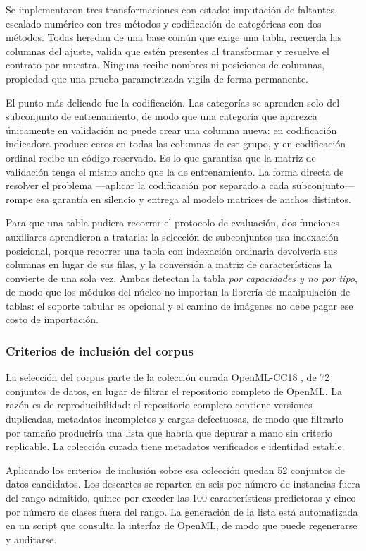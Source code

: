 \documentclass[12pt,letterpaper,oneside]{article}
\begin{document}
Se implementaron tres transformaciones con estado: imputación de faltantes, escalado
numérico con tres métodos y codificación de categóricas con dos métodos. Todas heredan de
una base común que exige una tabla, recuerda las columnas del ajuste, valida que estén
presentes al transformar y resuelve el contrato por muestra. Ninguna recibe nombres ni
posiciones de columnas, propiedad que una prueba parametrizada vigila de forma permanente.

El punto más delicado fue la codificación. Las categorías se aprenden solo del subconjunto
de entrenamiento, de modo que una categoría que aparezca únicamente en validación no puede
crear una columna nueva: en codificación indicadora produce ceros en todas las columnas de
ese grupo, y en codificación ordinal recibe un código reservado. Es lo que garantiza que la
matriz de validación tenga el mismo ancho que la de entrenamiento. La forma directa de
resolver el problema —aplicar la codificación por separado a cada subconjunto— rompe esa
garantía en silencio y entrega al modelo matrices de anchos distintos.

Para que una tabla pudiera recorrer el protocolo de evaluación, dos funciones auxiliares
aprendieron a tratarla: la selección de subconjuntos usa indexación posicional, porque
recorrer una tabla con indexación ordinaria devolvería sus columnas en lugar de sus filas, y
la conversión a matriz de características la convierte de una sola vez. Ambas detectan la
tabla \emph{por capacidades y no por tipo}, de modo que los módulos del núcleo no importan
la librería de manipulación de tablas: el soporte tabular es opcional y el camino de
imágenes no debe pagar ese costo de importación.

\subsubsection{Criterios de inclusión del corpus}

La selección del corpus parte de la colección curada OpenML-CC18 \cite{openml-cc18}, de 72
conjuntos de datos, en lugar de filtrar el repositorio completo de OpenML. La razón es de
reproducibilidad: el repositorio completo contiene versiones duplicadas, metadatos
incompletos y cargas defectuosas, de modo que filtrarlo por tamaño produciría una lista que
habría que depurar a mano sin criterio replicable. La colección curada tiene metadatos
verificados e identidad estable.

Aplicando los criterios de inclusión sobre esa colección quedan 52 conjuntos de datos
candidatos. Los descartes se reparten en seis por número de instancias fuera del rango
admitido, quince por exceder las 100 características predictoras y cinco por número de
clases fuera del rango. La generación de la lista está automatizada en un script que
consulta la interfaz de OpenML, de modo que puede regenerarse y auditarse.
\end{document}
